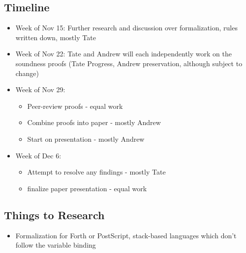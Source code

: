 \documentclass{article}
\begin{document}
\subsection{Timeline}
\begin{itemize}
    \item Week of Nov 15: Further research and discussion over formalization, rules written down, mostly Tate
    \item Week of Nov 22: Tate and Andrew will each independently work on the soundness proofs (Tate Progress, Andrew preservation, although subject to change)
    \item Week of Nov 29: 
        \begin{itemize}
            \item Peer-review proofs - equal work
            \item Combine proofs into paper - mostly Andrew
            \item Start on presentation - mostly Andrew
        \end{itemize}
    \item Week of Dec 6: 
        \begin{itemize} 
            \item Attempt to resolve any findings - mostly Tate
            \item finalize paper presentation - equal work
        \end{itemize}
\end{itemize}

\subsection{Things to Research}
\begin{itemize}
    \item Formalization for Forth or PostScript, stack-based languages which don't follow the variable binding
\end{itemize}
\end{document}
